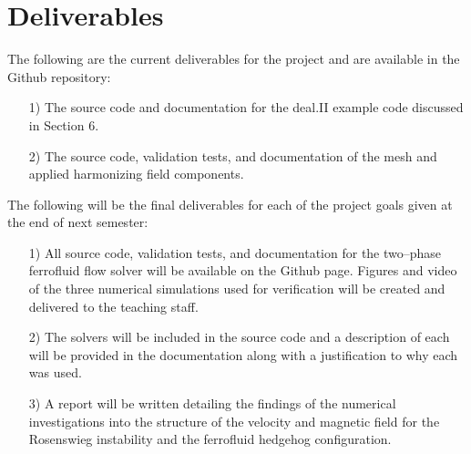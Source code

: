\documentclass[11pt,fullpage]{article}
\theoremstyle{lemma}
\theoremstyle{definition}
\theoremstyle{lemma}
\begin{document}
\section{Deliverables}
The following are the current deliverables for the project and are available in the Github repository:
\begin{itemize}
	\item[1)] The source code and documentation for the deal.II example code discussed in Section 6.
	
	\item[2)] The source code, validation tests, and documentation of the mesh and applied harmonizing field components.
\end{itemize}

The following will be the final deliverables for each of the project goals given at the end of next semester:
\begin{itemize}
	\item[1)] All source code, validation tests, and documentation for the two--phase ferrofluid flow solver will be available on the Github page. Figures and video of the three numerical simulations used for verification will be created and delivered to the teaching staff. 
	
	\item[2)] The solvers will be included in the source code and a description of each will be provided in the documentation along with a justification to why each was used.
	
	\item[3)] A report will be written detailing the findings of the numerical investigations into the structure of the velocity and magnetic field for the Rosenswieg instability and the ferrofluid hedgehog configuration.
\end{itemize}
\end{document}
